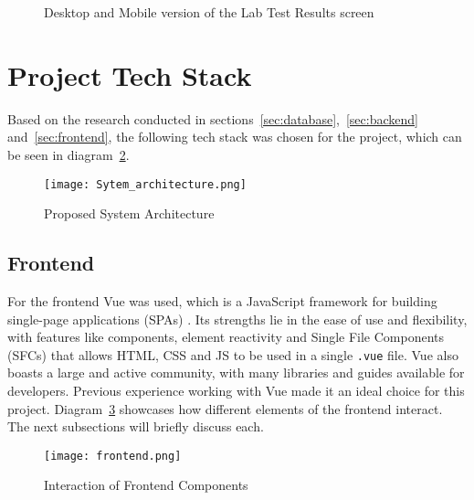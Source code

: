 \begin{figure}[ht]
    \centering
    \begin{minipage}[c]{0.70\textwidth}
    \end{minipage}
    \hspace{0.05\textwidth}
    \begin{minipage}[c]{0.20\textwidth}
    \end{minipage}
    \caption{Desktop and Mobile version of the Lab Test Results screen}\label{fig:lab}
\end{figure}

\section{Project Tech Stack}\label{sec:techstack}

Based on the research conducted in sections~\ref{sec:database},~\ref{sec:backend} and~\ref{sec:frontend}, the following tech stack was chosen for the project, which can be seen in diagram~\ref{fig:architecture}.

\begin{figure}[htbp]
    \centering
    \texttt{[image: Sytem\_architecture.png]}
    \caption{Proposed System Architecture}\label{fig:architecture}
\end{figure}

\subsection{Frontend}

For the frontend Vue was used, which is a JavaScript framework for building single-page applications (SPAs) \parencite{vue}. Its strengths lie in the ease of use and flexibility, with features like components, element reactivity and Single File Components (SFCs) that allows HTML, CSS and JS to be used in a single \lstinline{.vue} file. Vue also boasts a large and active community, with many libraries and guides available for developers. Previous experience working with Vue made it an ideal choice for this project. Diagram~\ref{fig:frontend} showcases how different elements of the frontend interact. The next subsections will briefly discuss each.

\begin{figure}[htbp]
    \centering
    \texttt{[image: frontend.png]}
    \caption{Interaction of Frontend Components}\label{fig:frontend}
\end{figure}

